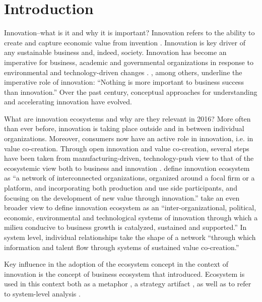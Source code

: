 \chapter{Introduction}
\label{chapter:intro}

Innovation--what is it and why it is important? Innovation refers to the ability to create and capture economic value from invention \citep{Hagel2005TheSpecialization}. Innovation is key driver of any sustainable business and, indeed, society. Innovation has become an imperative for business, academic and governmental organizations in response to environmental and technology-driven changes \citep{Drucker2015InnovationPrinciples,VandeVen1986CentralInnovation,Gupta2007InnovationAnalysis,Schumpeter1942CapitalismDemocracy}. \cite{Carlson2006}, among others, underline the imperative role of innovation: ``Nothing is more important to business success than innovation.'' Over the past century, conceptual approaches for understanding and accelerating innovation have evolved. 

What are innovation ecosystems and why are they relevant in 2016? More often than ever before, innovation is taking place outside and in between individual organizations. Moreover, consumers now have an active role in innovation, i.e. in value co-creation. Through open innovation and value co-creation, several steps have been taken from manufacturing-driven, technology-push view \citep{Schumpeter1934TheCycle,Schumpeter1942CapitalismDemocracy,Schumpeter1950TheSocialism} to that of the ecosystemic view both to business and innovation \citep{Russell2011TransformingOrchestration,Moore1993PredatorsCompetition,Jarvi2013}. \cite{Autio2013InnovationManagement} define innovation ecosystem as ``a network of interconnected organizations, organized around a focal firm or a platform, and incorporating both production and use side participants, and focusing on the development of new value through innovation.'' \cite{Russell2011TransformingOrchestration} take an even broader view to define innovation ecosystem as an ``inter-organizational, political, economic, environmental and technological systems of innovation through which a milieu conducive to business growth is catalyzed, sustained and supported.'' In system level, individual relationships take the shape of a network ``through which information and talent flow through systems of sustained value co-creation.'' \citep{Russell2015RelationalEcosystems}

Key influence in the adoption of the ecosystem concept in the context of innovation is the concept of business ecosystem that \cite{Moore1993PredatorsCompetition} introduced. Ecosystem is used in this context both as a metaphor \citep[e.g.][]{Hwang2012}, a strategy artifact \citep{Moore1993PredatorsCompetition}, as well as to refer to system-level analysis \citep[cf.][]{Pentland2015}. 

